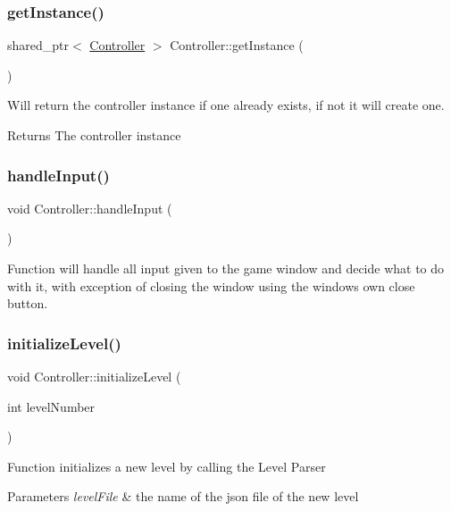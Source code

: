 \subsubsection{\texorpdfstring{get\+Instance()}{getInstance()}}
{\footnotesize\ttfamily shared\+\_\+ptr$<$ \hyperlink{classController}{Controller} $>$ Controller\+::get\+Instance (\begin{DoxyParamCaption}{ }\end{DoxyParamCaption})\hspace{0.3cm}{\ttfamily [static]}}

Will return the controller instance if one already exists, if not it will create one. \begin{DoxyReturn}{Returns}
The controller instance 
\end{DoxyReturn}
\mbox{\label{classController_aa8caf600ecfb41c59da3df61cd1291b2}} 
\subsubsection{\texorpdfstring{handle\+Input()}{handleInput()}}
{\footnotesize\ttfamily void Controller\+::handle\+Input (\begin{DoxyParamCaption}{ }\end{DoxyParamCaption})}

Function will handle all input given to the game window and decide what to do with it, with exception of closing the window using the window\textquotesingle{}s own close button. \mbox{\label{classController_a3742c489d3d26781155fcb7c06b6dfaa}} 
\subsubsection{\texorpdfstring{initialize\+Level()}{initializeLevel()}}
{\footnotesize\ttfamily void Controller\+::initialize\+Level (\begin{DoxyParamCaption}\item[{int}]{level\+Number }\end{DoxyParamCaption})}

Function initializes a new level by calling the Level Parser 
\begin{DoxyParams}{Parameters}
{\em level\+File} & the name of the json file of the new level \\
\hline
\end{DoxyParams}
\mbox{\label{classController_aa89ab5fe861da53f35c48f03005486de}} 
